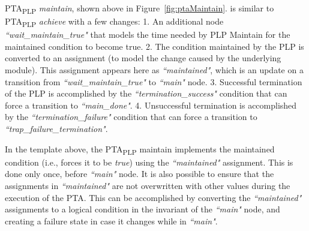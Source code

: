 \documentclass[letterpaper]{article}
\newcommand\rNote[1]{\todo[inline, author=Ronen, color=yellow]{#1}}
\newcommand\aNote[1]{\todo[inline, author=Alex, color=GreenYellow]{#1}}
\newcommand\commentout[1]{}
\newcommand{\frameImage}[4]{
\begin{figure}[H] 
  \centerline{
    \fcolorbox{frameColor}{white}{
        \texttt{[image: \#1]} } }
    \caption{#4}
    \label{fig:#1}
\end{figure}
}
\begin{document}
{%
PTA\textsubscript{PLP} \textit{maintain}, shown above in  Figure~\ref{fig:ptaMaintain}. is similar to PTA\textsubscript{PLP} \textit{achieve} with a few changes: 
1. An additional node \textit{``wait\_maintain\_true"} that models the time needed by PLP Maintain for the maintained condition to become true.
2. The condition maintained by the PLP is converted to an assignment (to model the change caused by the underlying module). This assignment appears here as \textit{``maintained"}, which is an update on a transition from \textit{``wait\_maintain\_true"} to \textit{``main"} node.
3. Successful termination of the PLP is accomplished by the \textit{``termination\_success"} condition that can force a transition to \textit{``main\_done"}. 4.  Unsuccessful termination is accomplished by the \textit{``termination\_failure"} condition that can force a transition to \textit{``trap\_failure\_termination"}.
\par In the template above, the PTA\textsubscript{PLP} maintain implements the maintained condition (i.e., forces it to be \textit{true})
using the \textit{``maintained"} assignment.
This is done only once, before \textit{``main"} node. It is also possible to 
ensure that the assignments in \textit{``maintained"} are not overwritten with other values during the execution of the PTA. This can be accomplished by converting the \textit{``maintained"} assignments to a logical condition in the invariant of the \textit{``main"} node, and creating a failure state in case it changes while in \textit{``main"}. 

\commentout{
}}
\end{document}
